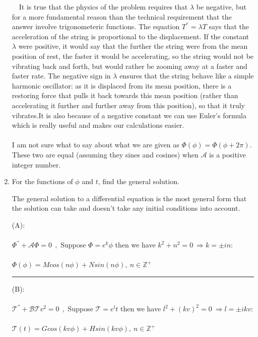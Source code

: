 \documentclass[fleqn]{article}
\begin{document}
\begin{enumerate}
      \textcolor{hwColor}{
        $~~~$ It is true that the physics of the problem requires that $\lambda$ be negative, but for a more fundamental reason than the technical 
        requirement that the answer involve trigonometeric functions.
        The equation $T^{''}=\lambda T$ says that the acceleration of the string is proportional to the displacement. 
        If the constant $\lambda$ were positive, it would say that the further the string were from the mean position of rest, 
        the faster it would be accelerating, so the string would not be vibrating back and forth, 
        but would rather be zooming away at a faster and faster rate.
        The negative sign in $\lambda$ ensures that the string behave like a simple harmonic oscillator: 
        as it is displaced from its mean position, there is a restoring force that pulls it back towards this mean 
        position (rather than accelerating it further and further away from this position), so that it truly vibrates.It is also because of a negative constant we can use Euler’s formula which is really useful and makes our calculations easier.
        \\
        \\
        I am not sure what to say about what we are given as $\Phi(\phi)=\Phi(\phi+ 2\pi)$. These two are equal (assuming they sines and cosines)
        when $\mathcal{A}$ is a positive integer number.
      }

    \pagebreak

    \item For the functions of $\phi$ and $t$, find the general solution. 

      \textcolor{hwColor}{
        The general solution to a differential equation is the most general form that the 
        solution can take and doesn't take any initial conditions into account. \\
      }

      \textcolor{hwColor}{
        (A): \\ \\
        $\Phi^{''}+\mathcal{A}\Phi=0 ~~,$ Suppose $\Phi=e^k \phi$ then we have $k^2+n^2=0 ~ \Rightarrow k=\pm in$: \\ \\
        $
          \Phi(\phi)=M cos(n \phi)+N sin(n \phi), ~ n\in \mathbb{Z}^{+} 
        $
      }

      \rule{15cm}{1pt}

      \textcolor{hwColor}{
        (B): \\ \\
        $\mathcal{T}^{''}+\mathcal{B}\mathcal{T}v^2=0 ~~,$ Suppose $\mathcal{T}=e^lt$ then we have $l^2+(k v)^2=0 ~ \Rightarrow l=\pm ikv$: \\
        \\
        $
          \mathcal{T}(t)=G cos(kv \phi)+H sin(kv \phi), ~ n\in \mathbb{Z}^{+} 
        $
      }


\end{enumerate}
\end{document}
